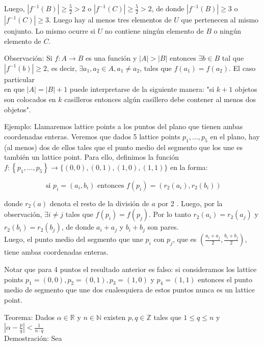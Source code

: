 \documentclass[10pt]{article}
\begin{document}
Luego, $\left|f^{-1}(B)\right| \geq \frac{5}{2}>2$ o $\left|f^{-1}(C)\right| \geq \frac{5}{2}>2$, de donde $\left|f^{-1}(B)\right| \geq 3$ o $\left|f^{-1}(C)\right| \geq 3$. Luego hay al menos tres elementos de $U$ que pertenecen al mismo conjunto. Lo mismo ocurre si $U$ no contiene ningún elemento de $B$ o ningún elemento de $C$.

Observación: Si $f: A \longrightarrow B$ es una función y $|A|>|B|$ entonces $\exists b \in B$ tal que $\left|f^{-1}(b)\right| \geq 2$, es decir, $\exists a_{1}, a_{2} \in A, a_{1} \neq a_{2}$, tales que $f\left(a_{1}\right)=f\left(a_{2}\right)$. El caso particular\\
en que $|A|=|B|+1$ puede interpretarse de la siguiente manera: "si $k+1$ objetos son colocados en $k$ casilleros entonces algún casillero debe contener al menos dos objetos".

Ejemplo: Llamaremos lattice points a los puntos del plano que tienen ambas coordenadas enteras. Veremos que dados 5 lattice points $p_{1}, \ldots, p_{5}$ en el plano, hay (al menos) dos de ellos tales que el punto medio del segmento que los une es también un lattice point. Para ello, definimos la función $f:\left\{p_{1}, \ldots, p_{5}\right\} \longrightarrow\{(0,0),(0,1),(1,0),(1,1)\}$ en la forma:

$$
\text { si } p_{i}=\left(a_{i}, b_{i}\right) \text { entonces } f\left(p_{i}\right)=\left(r_{2}\left(a_{i}\right), r_{2}\left(b_{i}\right)\right)
$$

donde $r_{2}(a)$ denota el resto de la división de $a$ por 2 . Luego, por la observación, $\exists i \neq j$ tales que $f\left(p_{i}\right)=f\left(p_{j}\right)$. Por lo tanto $r_{2}\left(a_{i}\right)=r_{2}\left(a_{j}\right)$ y $r_{2}\left(b_{i}\right)=r_{2}\left(b_{j}\right)$, de donde $a_{i}+a_{j}$ y $b_{i}+b_{j}$ son pares.\\
Luego, el punto medio del segmento que une $p_{i}$ con $p_{j}$, que es $\left(\frac{a_{i}+a_{j}}{2}, \frac{b_{i}+b_{j}}{2}\right)$, tiene ambas coordenadas enteras.

Notar que para 4 puntos el resultado anterior es falso: si consideramos los lattice points $p_{1}=(0,0), p_{2}=(0,1), p_{3}=(1,0)$ y $p_{4}=(1,1)$ entonces el punto medio de segmento que une dos cualesquiera de estos puntos nunca es un lattice point.

Teorema: Dados $\alpha \in \mathbb{R}$ y $n \in \mathbb{N}$ existen $p, q \in \mathbb{Z}$ tales que $1 \leq q \leq n$ y $\left|\alpha-\frac{p}{q}\right|<\frac{1}{n \cdot q}$\\
Demostración: Sea
\end{document}

